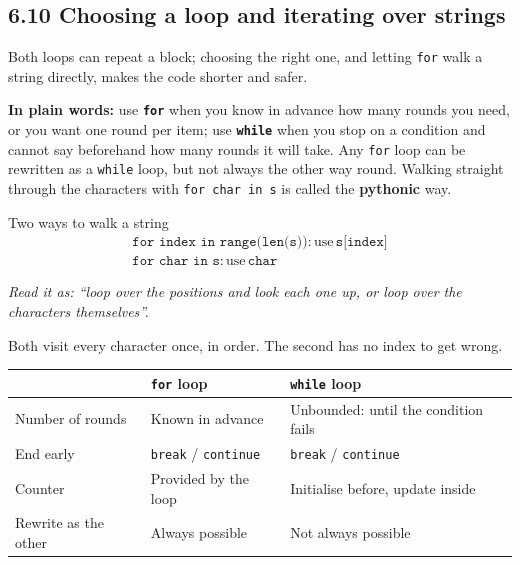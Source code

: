 \documentclass[11pt]{article}
\begin{document}
\begin{keepsection}
\section{6.10 Choosing a loop and iterating over strings}

Both loops can repeat a block; choosing the right one, and letting \texttt{for} walk a string directly, makes the code shorter and safer.

\begin{plainbox}\textbf{In plain words:} use \textbf{\texttt{for}} when you know in advance how many rounds you need, or you want one round per item; use \textbf{\texttt{while}} when you stop on a condition and cannot say beforehand how many rounds it will take. Any \texttt{for} loop can be rewritten as a \texttt{while} loop, but not always the other way round. Walking straight through the characters with \texttt{for char in s} is called the \textbf{pythonic} way.\end{plainbox}

\begin{equationcard}{Two ways to walk a string}
\[ \begin{gathered} \texttt{for index in range(len(s)):}\, \text{use}\, \texttt{s[index]} \\ \texttt{for char in s:}\, \text{use}\, \texttt{char} \end{gathered} \]
{\small \emph{Read it as: “loop over the positions and look each one up, or loop over the characters themselves”.}\par  Both visit every character once, in order. The second has no index to get wrong.}
\end{equationcard}

\begin{center}\small\begin{tabularx}{\linewidth}{>{\raggedright\arraybackslash}X>{\raggedright\arraybackslash}X>{\raggedright\arraybackslash}X}\toprule
\textbf{} & \textbf{\texttt{for} loop} & \textbf{\texttt{while} loop} \\ \midrule
Number of rounds & Known in advance & Unbounded: until the condition fails \\
End early & \texttt{break} / \texttt{continue} & \texttt{break} / \texttt{continue} \\
Counter & Provided by the loop & Initialise before, update inside \\
Rewrite as the other & Always possible & Not always possible \\
\bottomrule\end{tabularx}\end{center}


\end{keepsection}
\end{document}
